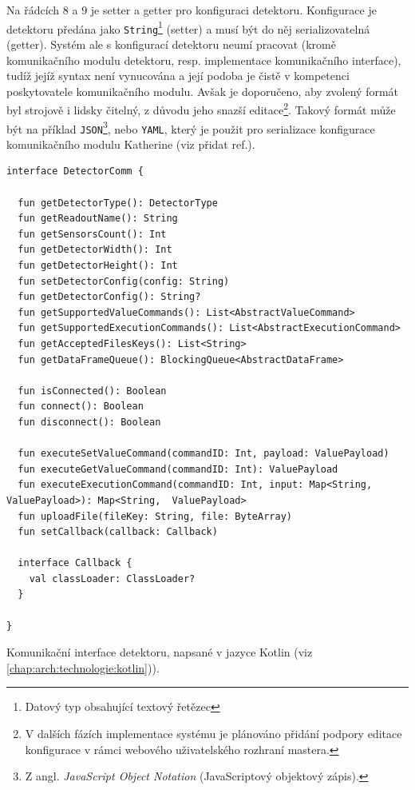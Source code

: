 Na řádcích 8 a 9 je setter a getter pro konfiguraci detektoru. Konfigurace je detektoru předána jako \texttt{String}\footnote{Datový typ obsahující textový řetězec} (setter) a musí být do něj serializovatelná (getter). Systém ale s konfigurací detektoru neumí pracovat (kromě komunikačního modulu detektoru, resp. implementace komunikačního interface), tudíž jejíž syntax není vynucována a její podoba je čistě v kompetenci poskytovatele komunikačního modulu. Avšak je doporučeno, aby zvolený formát byl strojově i lidsky čitelný, z důvodu jeho snazší editace\footnote{V dalších fázích implementace systému je plánováno přidání podpory editace konfigurace v rámci webového uživatelského rozhraní mastera.}. Takový formát může být na příklad \texttt{JSON}\footnote{Z angl. \textit{JavaScript Object Notation} (JavaScriptový objektový zápis).}, nebo \texttt{YAML}, který je použit pro serializace konfigurace komunikačního modulu Katherine (viz \todo přidat ref.).

\begin{verbatim}
interface DetectorComm {

  fun getDetectorType(): DetectorType
  fun getReadoutName(): String
  fun getSensorsCount(): Int
  fun getDetectorWidth(): Int
  fun getDetectorHeight(): Int
  fun setDetectorConfig(config: String)
  fun getDetectorConfig(): String?
  fun getSupportedValueCommands(): List<AbstractValueCommand>
  fun getSupportedExecutionCommands(): List<AbstractExecutionCommand>
  fun getAcceptedFilesKeys(): List<String>
  fun getDataFrameQueue(): BlockingQueue<AbstractDataFrame>
  
  fun isConnected(): Boolean
  fun connect(): Boolean
  fun disconnect(): Boolean
  
  fun executeSetValueCommand(commandID: Int, payload: ValuePayload)
  fun executeGetValueCommand(commandID: Int): ValuePayload
  fun executeExecutionCommand(commandID: Int, input: Map<String, ValuePayload>): Map<String,  ValuePayload>
  fun uploadFile(fileKey: String, file: ByteArray)
  fun setCallback(callback: Callback)
  
  interface Callback {
    val classLoader: ClassLoader?
  }

}
\end{verbatim}
\begin{code}[h!]
\caption{Komunikační interface detektoru, napsané v jazyce Kotlin (viz \ref{chap:arch:technologie:kotlin})).}
\label{src:handler:comm_intf}
\end{code}

